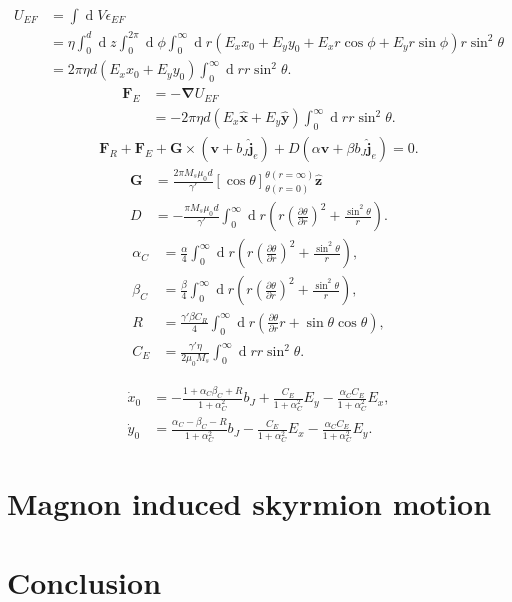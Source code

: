 \documentclass[12pt, a4paper, twoside, openright]{report}
\renewcommand{\d}[1]{\ensuremath{\operatorname{d}\!{#1}}}
\numberwithin{equation}{chapter}
\numberwithin{figure}{chapter}
\numberwithin{table}{chapter}
\begin{document}
\begin{align}
U_{EF} &= \int \d V \epsilon_{EF} \\
&= \eta \int_0^d \d z \int_0^{2\pi}\d \phi \int_0^{\infty}\d r\left( E_x x_0 + E_y y_0 + E_x r \cos\phi + E_y r \sin\phi \right) r \sin^2\theta \\
&= 2\pi\eta d\left(E_x x_0 + E_y y_0\right)\int_0^{\infty}\d r r \sin^2\theta.
\end{align}
\begin{align}
\mathbold{F}_E &= -\mathbold{\nabla}U_{EF} \\
&= -2\pi \eta d \left(E_x \mathbold{\hat{x}} + E_y \mathbold{\hat{y}}\right) \int_0^{\infty}\d r r \sin^2\theta.
\end{align}
\begin{align}
\mathbold{F}_R+\mathbold{F}_E + \mathbold{G} \times\left(\mathbold{v}+b_J\mathbold{\hat{j}}_e\right) + D\left(\alpha\mathbold{v}+\beta b_J \mathbold{\hat{j}}_e\right) = 0.
\end{align}
\begin{align}
\mathbold{G} &= \frac{2\pi M_s\mu_0 d}{\gamma'}\left[\cos\theta\right]_{\theta(r=0)}^{\theta(r=\infty)} \mathbold{\hat{z}}\\
D &= - \frac{\pi M_s \mu_0 d}{\gamma '} \int_0^{\infty} \d r \left(r\left(\frac{\partial \theta}{\partial r}\right)^2+\frac{\sin^2\theta}{r}\right).
\end{align}
\begin{align}
\alpha_C &= \frac{\alpha}{4} \int_0^{\infty} \d r \left(r\left(\frac{\partial \theta}{\partial r}\right)^2+\frac{\sin^2\theta}{r}\right), \\
\beta_C &=\frac{\beta}{4} \int_0^{\infty} \d r \left(r\left(\frac{\partial \theta}{\partial r}\right)^2+\frac{\sin^2\theta}{r}\right), \\
R &= \frac{\gamma'\beta C_R}{4} \int_0^{\infty} \d r \left(\frac{\partial \theta}{\partial r} r + \sin\theta\cos\theta \right), \\
C_E &= \frac{\gamma' \eta}{2\mu_0 M_s}\int_0^{\infty}\d r r\sin^2\theta.
\end{align}

\begin{align}
\dot{x}_0 &= - \frac{1+\alpha_C\beta_C + R}{1+\alpha_C^2}b_J + \frac{C_E}{1+\alpha_C^2}E_y - \frac{\alpha_C C_E}{1+\alpha_C^2}E_x, \\
\dot{y}_0 &= \frac{\alpha_C-\beta_C - R}{1+\alpha_C^2}b_J - \frac{C_E}{1+\alpha_C^2}E_x - \frac{\alpha_C C_E}{1+\alpha_C^2}E_y.
\end{align}

\chapter{Magnon induced skyrmion motion}

\chapter{Conclusion}



\end{document}
